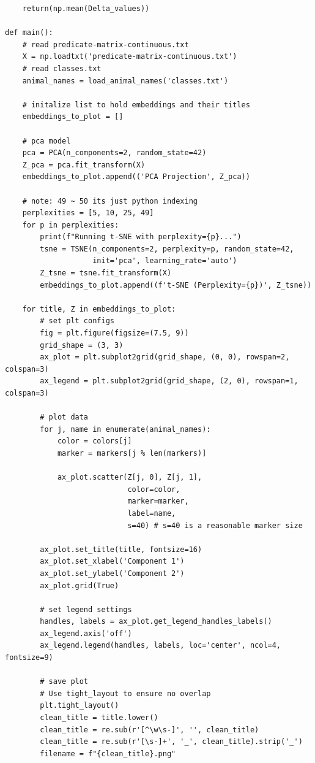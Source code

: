 \documentclass{article}
\begin{document}
{\begin{lstlisting}
    return(np.mean(Delta_values))

def main():
    # read predicate-matrix-continuous.txt
    X = np.loadtxt('predicate-matrix-continuous.txt')
    # read classes.txt
    animal_names = load_animal_names('classes.txt')
    
    # initalize list to hold embeddings and their titles
    embeddings_to_plot = []

    # pca model
    pca = PCA(n_components=2, random_state=42)
    Z_pca = pca.fit_transform(X)
    embeddings_to_plot.append(('PCA Projection', Z_pca))

    # note: 49 ~ 50 its just python indexing
    perplexities = [5, 10, 25, 49]
    for p in perplexities:
        print(f"Running t-SNE with perplexity={p}...")
        tsne = TSNE(n_components=2, perplexity=p, random_state=42, 
                    init='pca', learning_rate='auto')
        Z_tsne = tsne.fit_transform(X)
        embeddings_to_plot.append((f't-SNE (Perplexity={p})', Z_tsne))
    
    for title, Z in embeddings_to_plot:
        # set plt configs
        fig = plt.figure(figsize=(7.5, 9))
        grid_shape = (3, 3)
        ax_plot = plt.subplot2grid(grid_shape, (0, 0), rowspan=2, colspan=3)
        ax_legend = plt.subplot2grid(grid_shape, (2, 0), rowspan=1, colspan=3)
        
        # plot data
        for j, name in enumerate(animal_names):
            color = colors[j]
            marker = markers[j % len(markers)]
            
            ax_plot.scatter(Z[j, 0], Z[j, 1], 
                            color=color, 
                            marker=marker, 
                            label=name, 
                            s=40) # s=40 is a reasonable marker size
        
        ax_plot.set_title(title, fontsize=16)
        ax_plot.set_xlabel('Component 1')
        ax_plot.set_ylabel('Component 2')
        ax_plot.grid(True)
        
        # set legend settings
        handles, labels = ax_plot.get_legend_handles_labels()
        ax_legend.axis('off')
        ax_legend.legend(handles, labels, loc='center', ncol=4, fontsize=9)
        
        # save plot
        # Use tight_layout to ensure no overlap
        plt.tight_layout()
        clean_title = title.lower()
        clean_title = re.sub(r'[^\w\s-]', '', clean_title) 
        clean_title = re.sub(r'[\s-]+', '_', clean_title).strip('_')
        filename = f"{clean_title}.png"
        

\end{lstlisting}}
\end{document}
